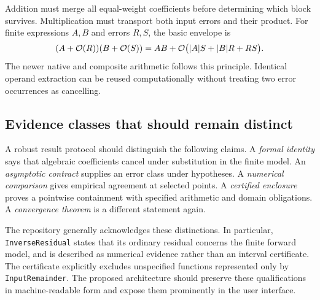 Addition must merge all equal-weight coefficients before determining which block survives. Multiplication must transport both input errors and their product. For finite expressions $A,B$ and errors $R,S$, the basic envelope is
\begin{equation}\label{eq:producterror}
 (A+\mathcal O(R))(B+\mathcal O(S))
 =AB+\mathcal O\bigl(|A|S+|B|R+RS\bigr).
\end{equation}
The newer native and composite arithmetic follows this principle. Identical operand extraction can be reused computationally without treating two error occurrences as cancelling.\cite{native,commit}

\subsection{Evidence classes that should remain distinct}

A robust result protocol should distinguish the following claims. A \emph{formal identity} says that algebraic coefficients cancel under substitution in the finite model. An \emph{asymptotic contract} supplies an error class under hypotheses. A \emph{numerical comparison} gives empirical agreement at selected points. A \emph{certified enclosure} proves a pointwise containment with specified arithmetic and domain obligations. A \emph{convergence theorem} is a different statement again.

The repository generally acknowledges these distinctions. In particular, \texttt{InverseResidual} states that its ordinary residual concerns the finite forward model, and  is described as numerical evidence rather than an interval certificate. The certificate explicitly excludes unspecified functions represented only by \texttt{InputRemainder}. The proposed architecture should preserve these qualifications in machine-readable form and expose them prominently in the user interface.\cite{core,certificates,guide}
